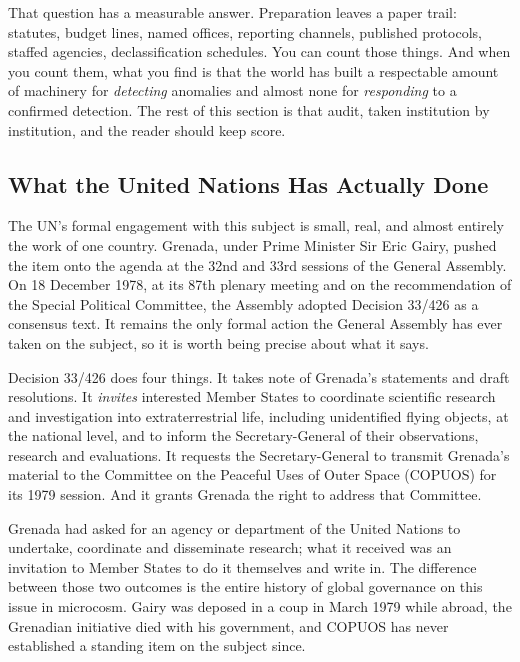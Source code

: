 That question has a measurable answer. Preparation leaves a paper trail: statutes, budget lines,
named offices, reporting channels, published protocols, staffed agencies, declassification
schedules. You can count those things. And when you count them, what you find is that the world
has built a respectable amount of machinery for \emph{detecting} anomalies and almost none for
\emph{responding} to a confirmed detection. The rest of this section is that audit, taken
institution by institution, and the reader should keep score.

\subsection{What the United Nations Has Actually Done}

The UN's formal engagement with this subject is small, real, and almost entirely the work of one
country. Grenada, under Prime Minister Sir Eric Gairy, pushed the item onto the agenda at the 32nd
and 33rd sessions of the General Assembly. On 18 December 1978, at its 87th plenary meeting and on
the recommendation of the Special Political Committee, the Assembly adopted Decision 33/426 as a
consensus text. It remains the only formal action the General Assembly has ever taken on the
subject, so it is worth being precise about what it says.

Decision 33/426 does four things. It takes note of Grenada's statements and draft resolutions. It
\emph{invites} interested Member States to coordinate scientific research and investigation into
extraterrestrial life, including unidentified flying objects, at the national level, and to inform
the Secretary-General of their observations, research and evaluations. It requests the
Secretary-General to transmit Grenada's material to the Committee on the Peaceful Uses of Outer
Space (COPUOS) for its 1979 session. And it grants Grenada the right to address that Committee.

 Grenada had asked
for an agency or department of the United Nations to undertake, coordinate and disseminate research;
what it received was an invitation to Member States to do it themselves and write in. The
difference between those two outcomes is the entire history of global governance on this issue in
microcosm. Gairy was deposed in a coup in March 1979 while abroad, the Grenadian initiative died
with his government, and COPUOS has never established a standing item on the subject since.

